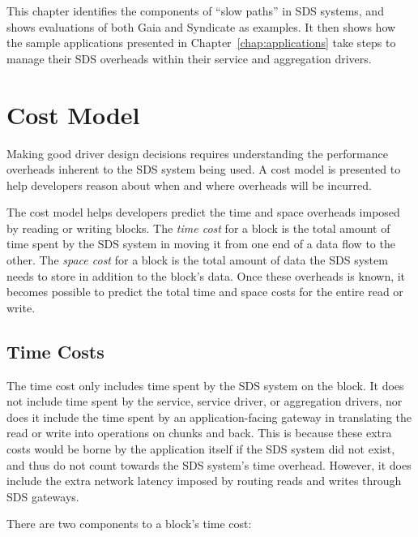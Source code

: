 This chapter identifies the components of ``slow paths'' in SDS systems,
and shows evaluations of both Gaia and Syndicate as examples.  It then
shows how the sample applications presented in Chapter~\ref{chap:applications}
take steps to manage their SDS overheads within their service and aggregation
drivers.

\section{Cost Model}

Making good driver design decisions requires understanding the
performance overheads inherent to the SDS system being used.
A cost model is presented to help
developers reason about when and where overheads will be incurred.

The cost model helps developers predict the time and space overheads imposed by
reading or writing blocks.  The \emph{time cost} for a block is the
total amount of time spent by the SDS system in moving it from one end of a data
flow to the other.  The \emph{space cost} for a block is the total amount of data the SDS
system needs to store in addition to the block's data.
Once these overheads is known, it becomes
possible to predict the total time and space costs for the entire read or write.




\subsection{Time Costs}

The time cost only includes time spent by the SDS system on the block.  It does not include
time spent by the service, service driver, or aggregation drivers, nor does it include the time
spent by an application-facing gateway in translating the read or write into
operations on chunks and back.  This is because these extra
costs would be borne by the application itself if the SDS system did not exist, and
thus do not count towards the SDS system's time overhead.  However, it does
include the extra network latency imposed by routing reads and writes through
SDS gateways.

There are two components to a block's time cost:

